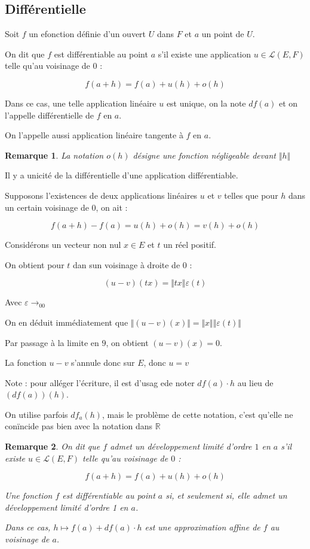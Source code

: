 \documentclass[a4paper,12pt]{book}
\newcommand{\Def}[2]{\begin{tcolorbox}[sharp corners, colback=white,colframe=blue!90!black!75, title=Définition : #1]#2\end{tcolorbox}}
\newcommand{\Prop}[2]{\begin{tcolorbox}[sharp corners, colback=white,colframe=red!90!black!75, title=Proposition : #1]#2\end{tcolorbox}}
\newcommand{\Pre}[1]{\begin{tcolorbox}[sharp corners, colback=white,colframe=green!60!green!30!black!75, title=Preuve]#1\end{tcolorbox}}
\newtheorem{Rem}{Remarque}[section]
\def\R{\mathbb{R}}
\begin{document}
\subsection{Différentielle}
\Def{}{Soit $f$ un efonction définie d'un ouvert $U$ dans $F$ et $a$ un point de $U$.
\par On dit que $f$ est différentiable au point $a$ s'il existe une application $u\in\mathcal{L}(E,F)$ telle qu'au voisinage de $0$ :
\par $$f(a+h) = f(a) + u(h) + o(h)$$
\par Dans ce cas, une telle application linéaire $u$ est unique, on la note $df(a)$ et on l'appelle différentielle de $f$ en $a$.
\par On l'appelle aussi application linéaire tangente à $f$ en $a$.}
\begin{Rem}
La notation $o(h)$ désigne une fonction négligeable devant $\Vert h\Vert$
\end{Rem}
\Prop{}{Il y a unicité de la différentielle d'une application différentiable.}
\Pre{Supposons l'existences de deux applications linéaires $u$ et $v$ telles que pour $h$ dans un certain voisinage de $0$, on ait :
\par $$ f(a+h) - f(a) = u(h) + o(h) = v(h)+o(h)$$
\par Considérons un vecteur non nul $x\in E$ et $t$ un réel positif.
\par On obtient pour $t$ dan sun voisinage à droite de $0$ :
\par $$(u-v)(tx) = \Vert tx\Vert\varepsilon(t)$$
\par Avec $\varepsilon\to_00$
\par On en déduit immédiatement que $\Vert (u-v)(x)\Vert = \Vert x\Vert\Vert \varepsilon(t)\Vert$
\par Par passage à la limite en $9$, on obtient $(u-v)(x)=0$.
\par La fonction $u-v$ s'annule donc sur $E$, donc $u=v$}
Note : pour alléger l'écriture, il est d'usag ede noter $df(a)\cdot h$ au lieu de $(df(a))(h)$.
\par On utilise parfois $df_a(h)$, mais le problème de cette notation, c'est qu'elle ne conïncide pas bien avec la notation dans $\R$   
\begin{Rem}
On dit que $f$ admet un développement limité d'ordre $1$ en $a$ s'il existe $u\in\mathcal{L}(E, F)$ telle qu'au voisinage de $0$ :
\par $$f(a+h)=f(a)+u(h)+o(h)$$
\par Une fonction $f$ est différentiable au point $a$ si, et seulement si, elle admet un développement limité d'ordre 1 en $a$.
\par Dans ce cas, $h\mapsto f(a)+df(a)\cdot h$ est une approximation affine de $f$ au voisinage de $a$.
\end{Rem}
\end{document}

